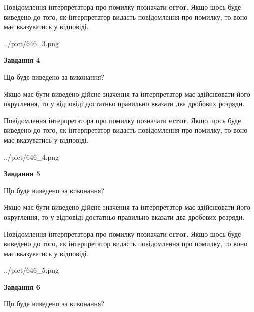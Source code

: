 \documentclass[12pt, ukrainian]{article}
\begin{document}
{\begin {Large}
Повідомлення інтерпретатора про помилку позначати \textbf{error}.
Якщо щось буде виведено до того, як інтерпретатор видасть повідомлення про помилку, 
то воно має вказуватись у відповіді. \par

\begin{center}
	{../pict/646_3.png}
\end{center}
\newpage

{\begin {center}\textbf{Завдання 4}\end {center}}\par
Що буде виведено за виконання? \par

Якщо має бути виведено дійсне значення та інтерпретатор має здійснювати його округлення, 
то у відповіді достатньо правильно вказати два дробових розряди.

Повідомлення інтерпретатора про помилку позначати \textbf{error}.
Якщо щось буде виведено до того, як інтерпретатор видасть повідомлення про помилку, 
то воно має вказуватись у відповіді. \par

\begin{center}
	{../pict/646_4.png}
\end{center}
\newpage

{\begin {center}\textbf{Завдання 5}\end {center}}\par
Що буде виведено за виконання? \par

Якщо має бути виведено дійсне значення та інтерпретатор має здійснювати його округлення, 
то у відповіді достатньо правильно вказати два дробових розряди.

Повідомлення інтерпретатора про помилку позначати \textbf{error}.
Якщо щось буде виведено до того, як інтерпретатор видасть повідомлення про помилку, 
то воно має вказуватись у відповіді. \par

\begin{center}
	{../pict/646_5.png}
\end{center}
\newpage

{\begin {center}\textbf{Завдання 6}\end {center}}\par
Що буде виведено за виконання? \par


\end{Large}}
\end{document}
